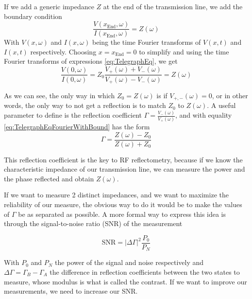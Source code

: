 \documentclass[../main.tex]{subfiles}
\begin{document}
If we add a generic impedance \(Z\) at the end of the transmission line, we
add the boundary condition
\begin{equation*}
\label{eq:RfBoundCond}
    \frac{V(x_{\text{End}},\omega)}{I(x_{\text{End}},\omega)} = Z(\omega)
\end{equation*}
With \(V(x,\omega)\) and \(I(x,\omega)\) being the time Fourier transforms of
\(V(x,t)\) and \(I(x,t)\) respectively. Choosing \(x=x_{\text{End}}=0\) to
simplify and using the time Fourier transforms of expressions
\ref{eq:TelegraphEq}, we get
\begin{equation}
\label{eq:TelegraphEqFourierWithBound}
    \frac{V(0,\omega)}{I(0,\omega)} =
    Z_{0}\frac{V_{+}(\omega) + V_{-}(\omega)}
    {V_{+}(\omega) - V_{-}(\omega)} = Z(\omega)
\end{equation}

As we can see, the only way in which \(Z_{0} = Z(\omega)\) is if
\(V_{+,-}(\omega)=0\), or in other words, the only way to not get a reflection
is to match \(Z_{0}\) to \(Z(\omega)\). A useful parameter to define is the
reflection coefficient \(\Gamma = \frac{V_{-}(\omega)}{V_{+}(\omega)}\), and
with equality \ref{eq:TelegraphEqFourierWithBound} has the form
\begin{equation}
\label{eq:ReflecCoeff}
    \Gamma = \frac{Z(\omega) - Z_{0}}{Z(\omega) + Z_{0}}
\end{equation}

This reflection coefficient is the key to RF reflectometry, because if we
know the characteristic impedance of our transmission line, we can measure
the power and the phase reflected and obtain \(Z(\omega)\).

If we want to measure 2 distinct impedances, and we want to maximize the
reliability of our measure, the obvious way to do it would be to make the values
of \(\Gamma\) be as separated as possible. A more formal way to express this
idea is through the signal-to-noise ratio (SNR)\cite{vigneauProbingQuantumDevices2023} of the measurement

\begin{equation}
\label{eq:SNR}
\text{SNR} = |\Delta\Gamma|^2\frac{P_{0}}{P_{N}}
\end{equation}

With \(P_{0}\) and \(P_{N}\) the power of the signal and noise respectively and
\(\Delta\Gamma = \Gamma_{B} - \Gamma_{A}\) the difference in reflection
coefficients between the two states to measure, whose modulus is what is
called the contrast. If we want to improve our measurements, we need to
increase our SNR.
\end{document}
